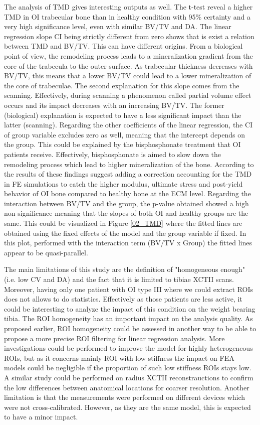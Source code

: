 \documentclass[a4paper,fleqn]{DC_ArtStyle}
\begin{document}
The analysis of TMD gives interesting outputs as well. The t-test reveal a higher TMD in OI trabecular bone than in healthy condition with 95\% certainty and a very high significance level, even with similar BV/TV and DA. The linear regression slope CI being strictly different from zero shows that is exist a relation between TMD and BV/TV. This can have different origins. From a biological point of view, the remodeling process leads to a mineralization gradient from the core of the trabecula to the outer surface. As trabecular thickness decreases with BV/TV, this means that a lower BV/TV could lead to a lower mineralization of the core of trabeculae. The second explanation for this slope comes from the scanning. Effectively, during scanning a phenomenon called partial volume effect occurs and its impact decreases with an increasing BV/TV. The former (biological) explanation is expected to have a less significant impact than the latter (scanning). Regarding the other coefficients of the linear regression, the CI of group variable excludes zero as well, meaning that the intercept depends on the group. This could be explained by the bisphosphonate treatment that OI patients receive. Effectively, bisphosphonate is aimed to slow down the remodeling process which lead to higher mineralization of the bone. According to the results of \citeauthor{Indermaur2021}\cite{Indermaur2021} these findings suggest adding a correction accounting for the TMD in FE simulations to catch the higher modulus, ultimate stress and post-yield behavior of OI bone compared to healthy bone at the ECM level. Regarding the interaction between BV/TV and the group, the p-value obtained showed a high non-significance meaning that the slopes of both OI and healthy groups are the same. This could be visualized in Figure \ref{02_TMD} where the fitted lines are obtained using the fixed effects of the model and the group variable if fixed. In this plot, performed with the interaction term (BV/TV x Group) the fitted lines appear to be quasi-parallel.

The main limitations of this study are the definition of "homogeneous enough" (i.e. low CV and DA) and the fact that it is limited to tibiae XCTII scans. Moreover, having only one patient with OI type III where we could extract ROIs does not allows to do statistics. Effectively as those patients are less active, it could be interesting to analyze the impact of this condition on the weight bearing tibia. The ROI homogeneity has an important impact on the analysis quality. As proposed earlier, ROI homogeneity could be assessed in another way to be able to propose a more precise ROI filtering for linear regression analysis. More investigations could be performed to improve the model for highly heterogeneous ROIs, but as it concerns mainly ROI with low stiffness the impact on FEA models could be negligible if the proportion of such low stiffness ROIs stays low. A similar study could be performed on radius XCTII reconstrauctions to confirm the low differences between anatomical locations for coarser resolution. Another limitation is that the measurements were performed on different devices which were not cross-calibrated. However, as they are the same model, this is expected to have a minor impact.\\
\end{document}
